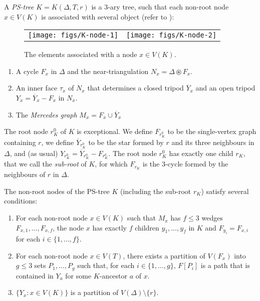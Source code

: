 \documentclass{patmorin}
\renewcommand{\proplabel}[1]{\label{prop:#1}}
\begin{document}
A \emph{PS-tree}  $K=K(\Delta, T, r)$ is a 3-ary tree, such that each non-root node $x\in V(K)$ is associated with several object (refer to ):

\begin{figure}
  \begin{center}
    \begin{tabular}{cc}
      \texttt{[image: figs/K-node-1]} &
      \texttt{[image: figs/K-node-2]}
    \end{tabular}
  \end{center}
  \caption{The elements associated with a node $x\in V(K)$.}
\end{figure}

\begin{enumerate}
  \item A cycle $F_x$ in $\Delta$ and the near-triangulation $N_x=\Delta\circledast F_x$.
  
  \item An inner face $\tau_x$ of $N_x$ that determines a closed tripod $\overline{Y}_x$ and an open tripod $Y_x=\overline{Y}_x-F_x$ in $N_x$.
  
  \item The \emph{Mercedes graph} $M_x=F_x\cup \overline{Y}_x$
\end{enumerate}

The root node $r^0_K$ of $K$ is exceptional.  We define $F_{r^0_K}$ to be the single-vertex graph containing $r$, we define $\overline{Y}_{r^0_K}$ to be the star formed by $r$ and its three neighbours in $\Delta$, and (as usual) $Y_{r^0_K}=\overline{Y}_{r^0_K}-F_{r^0_K}$.  The root node $r^0_K$ has exactly one child $r_K$, that we call the \emph{sub-root} of $K$, for which $F_{r_K}$ is the 3-cycle formed by the neighbours of $r$ in $\Delta$.

The non-root nodes of the PS-tree $K$ (including the sub-root $r_K$) satisfy several conditions:
\begin{enumerate}[(PR1)]
  \item \proplabel{children} For each non-root node $x\in V(K)$ such that $M_x$ has $f\le 3$ wedges $F_{x,1},\ldots,F_{x,f}$, the node $x$ has exactly $f$ children $y_1,\ldots,y_f$ in $K$ and $F_{y_i} = F_{x,i}$ for each $i\in\{1,\ldots,f\}$.
  
  \item \proplabel{ancestor-boundary} For each non-root node $x\in V(T)$, there exists a partition of $V(F_x)$ into $g\le 3$ sets $P_1,\ldots,P_g$ such that, for each $i\in\{1,\ldots,g\}$, $F[P_i]$ is a path that is contained in $Y_a$ for some $K$-ancestor $a$ of $x$. 

  \item \proplabel{partition} $\{Y_x : x\in V(K)\}$ is a partition of $V(\Delta)\setminus\{r\}$.
\end{enumerate}
\end{document}
